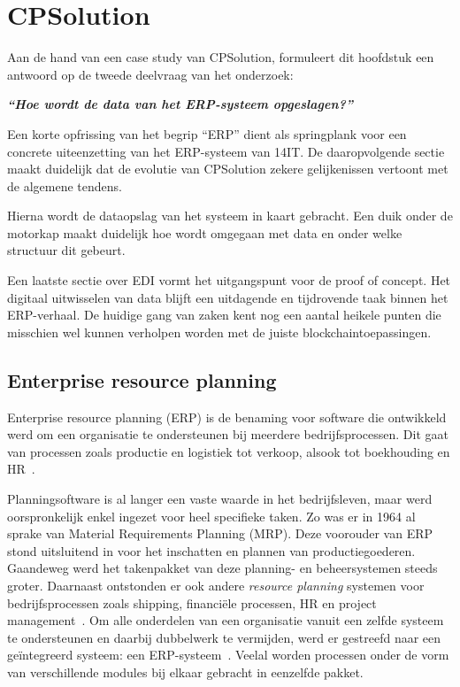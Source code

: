 \chapter{CPSolution}
\label{ch:cpsolution}

Aan de hand van een case study van CPSolution, formuleert dit hoofdstuk een antwoord op de tweede deelvraag van het onderzoek:

\begin{center}
	\textit{\textbf{``Hoe wordt de data van het ERP-systeem opgeslagen?''}}
\end{center}

Een korte opfrissing van het begrip ``ERP'' dient als springplank voor een concrete uiteenzetting van het ERP-systeem van 14IT. De daaropvolgende sectie maakt duidelijk dat de evolutie van CPSolution zekere gelijkenissen vertoont met de algemene tendens. 

Hierna wordt de dataopslag van het systeem in kaart gebracht. Een duik onder de motorkap maakt duidelijk hoe wordt omgegaan met data en onder welke structuur dit gebeurt. 

Een laatste sectie over EDI vormt het uitgangspunt voor de proof of concept. Het digitaal uitwisselen van data blijft een uitdagende en tijdrovende taak binnen het ERP-verhaal. De huidige gang van zaken kent nog een aantal heikele punten die misschien wel kunnen verholpen worden met de juiste blockchaintoepassingen.


\section{Enterprise resource planning}
\label{sec:enterprise-resource-planning}

Enterprise resource planning (ERP) is de benaming voor software die ontwikkeld werd om een organisatie te ondersteunen bij meerdere bedrijfsprocessen. Dit gaat van processen zoals productie en logistiek tot verkoop, alsook tot boekhouding en HR~\autocite{Shehab2004}. 

Planningsoftware is al langer een vaste waarde in het bedrijfsleven, maar werd oorspronkelijk enkel ingezet voor heel specifieke taken. Zo was er in 1964 al sprake van Material Requirements Planning (MRP). Deze voorouder van ERP stond uitsluitend in voor het inschatten en plannen van productiegoederen. Gaandeweg werd het takenpakket van deze planning- en beheersystemen steeds groter. Daarnaast ontstonden er ook andere \textit{resource planning} systemen voor bedrijfsprocessen zoals shipping, financiële processen, HR en project management~\autocite{Antjon2021}. Om alle onderdelen van een organisatie vanuit een zelfde systeem te ondersteunen en daarbij dubbelwerk te vermijden, werd er gestreefd naar een geïntegreerd systeem: een ERP-systeem~\autocite{Verbeiren2020}. Veelal worden processen onder de vorm van verschillende modules bij elkaar gebracht in eenzelfde pakket.

